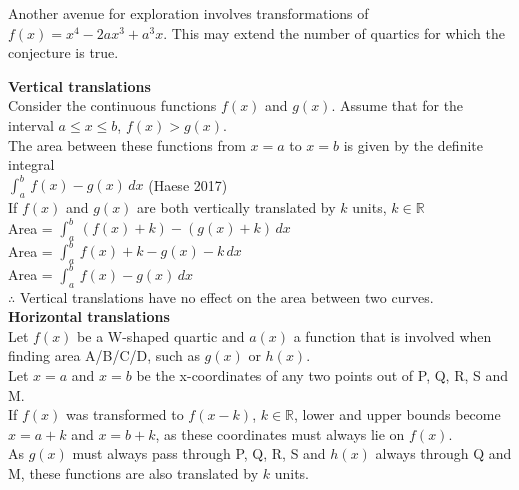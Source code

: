 \documentclass{homework}
\begin{document}
\begin{flushleft}
Another avenue for exploration involves transformations of $f(x)=x^4-2ax^3+a^3x$. This may extend the number of quartics for which the conjecture is true. \vspace{1.5em} \\
\begin{paracol}{2}
    \textbf{Vertical translations} \vspace{0.8em}\\
     Consider the continuous functions $f(x)$ and $g(x)$. Assume that for the interval $a\leq x\leq b$, $f(x)>g(x)$.\vspace{0.8em}\\
    The area between these functions from $x=a$ to $x=b$ is given by the definite integral \vspace{0.8em}\\ 
    $\int_a^b\, f(x)-g(x) \, dx$ \hspace{4em} (Haese 2017) \vspace{0.8em}\\ 
    If $f(x)$ and $g(x)$ are both vertically translated by $k$ units, $k\in \mathbb{R}$ \vspace{0.8em}\\ 
    Area = $\int_a^b\, (f(x)+k)-(g(x)+k) \, dx$ \vspace{0.8em}\\ 
    Area = $\int_a^b\, f(x)+k-g(x)-k \, dx$ \vspace{0.8em}\\ 
    Area = $\int_a^b\, f(x)-g(x) \, dx$ \vspace{0.8em}\\
    $\therefore$ Vertical translations have no effect on the area between two curves. \switchcolumn
    \textbf{Horizontal translations } \vspace{0.8em}\\
    Let $f(x)$ be a W-shaped quartic and $a(x)$ a function that is involved when finding area A/B/C/D, such as $g(x)$ or $h(x)$. \vspace{0.8em}\\
    Let $x=a$ and $x=b$ be the x-coordinates of any two points out of P, Q, R, S and M. \vspace{0.8em}\\
    If $f(x)$ was transformed to $f(x-k)$, $k\in \mathbb{R}$, lower and upper bounds become $x=a+k$ and $x=b+k$, as these coordinates must always lie on $f(x)$. \vspace{0.8em}\\
    As $g(x)$ must always pass through P, Q, R, S and $h(x)$ always through Q and M, these functions are also translated by $k$ units. \vspace{0.8em}\\

\end{paracol}
\end{flushleft}
\end{document}
